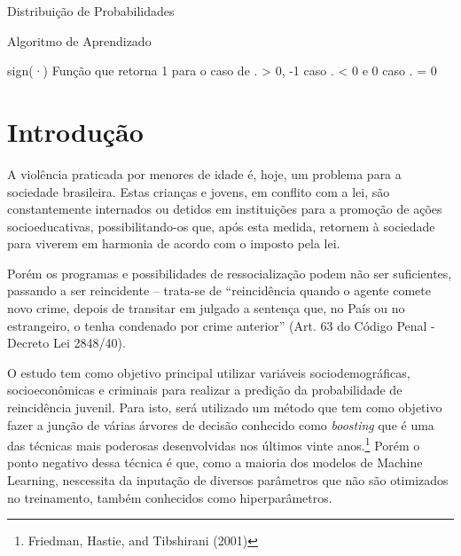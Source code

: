 \documentclass[
	12pt,				%
	a4paper,		%
	oneside,    %
	chapter=TITLE,		   %
	section=TITLE,		   %
	subsection=TITLE,	   %
	subsubsection=TITLE, %
	english,			%
	french,				%
	spanish,			%
	brazil,				%
]{abntex2}
\begin{document}
\listoftables*
\clearpage

\begin{siglas}
  \item[\mathcal{D}] Distribuição de Probabilidades
  \item[\xi] Algoritmo de Aprendizado
  \item[sign(·)] Função que retorna 1 para o caso de . > 0, -1 caso . < 0 e 0 caso . = 0
\end{siglas}


\tableofcontents*
\clearpage

\textual

\hypertarget{introduuxe7uxe3o}{%
\chapter{Introdução}\label{introduuxe7uxe3o}}

A violência praticada por menores de idade é, hoje, um problema para a
sociedade brasileira. Estas crianças e jovens, em conflito com a lei,
são constantemente internados ou detidos em instituições para a promoção
de ações socioeducativas, possibilitando-os que, após esta medida,
retornem à sociedade para viverem em harmonia de acordo com o imposto
pela lei.

Porém os programas e possibilidades de ressocialização podem não ser
suficientes, passando a ser reincidente -- trata-se de ``reincidência
quando o agente comete novo crime, depois de transitar em julgado a
sentença que, no País ou no estrangeiro, o tenha condenado por crime
anterior'' (Art. 63 do Código Penal - Decreto Lei 2848/40).

O estudo tem como objetivo principal utilizar variáveis
sociodemográficas, socioeconômicas e criminais para realizar a predição
da probabilidade de reincidência juvenil. Para isto, será utilizado um
método que tem como objetivo fazer a junção de várias árvores de decisão
conhecido como \emph{boosting} que é uma das técnicas mais poderosas
desenvolvidas nos últimos vinte anos.\footnote{Friedman, Hastie, and
  Tibshirani (2001)} Porém o ponto negativo dessa técnica é que, como a
maioria dos modelos de Machine Learning, nescessita da inputação de
diversos parâmetros que não são otimizados no treinamento, também
conhecidos como hiperparâmetros.
\end{document}
